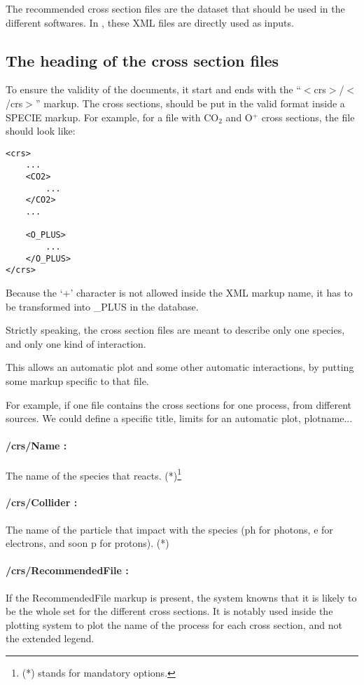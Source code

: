 The recommended cross section files are the dataset that should be used in the different softwares. In \Prog, these XML files are directly used as inputs.


\subsection{The heading of the cross section files}


To ensure the validity of the documents, it start and ends with the ``$<$crs$>$/$<$/crs$>$'' markup. 
The cross sections, should be put in the valid format inside a SPECIE markup. For example, for a file with CO$_2$ and O$^+$ cross sections, the file should look like:

\begin{verbatim}
<crs>
	...
	<CO2>
		...
	</CO2>
	...

	<O_PLUS>
		...
	</O_PLUS>
</crs>
\end{verbatim}

Because the `+'  character is not allowed inside the XML markup name, it has to be transformed into \_PLUS in the database.

Strictly speaking, the cross section files are meant to describe only one species, and only one kind of interaction. 


This allows an automatic plot and some other automatic interactions, by putting some markup specific to that file.

For example, if one file contains the cross sections for one process, from different sources. We could define a specific title, limits for an automatic plot, plotname...


\paragraph{/crs/Name :} The name of the species that reacts. (*)\footnote{(*) stands for mandatory options.}
\paragraph{/crs/Collider :} The name of the particle that impact with the species (ph for photons, e for electrons, and soon p for protons). (*)
\paragraph{/crs/RecommendedFile :} If the RecommendedFile markup is present, the system knowns that it is likely to be the whole set for the different cross sections. It is notably used inside the plotting system to plot the name of the process for each cross section, and not the extended legend.
